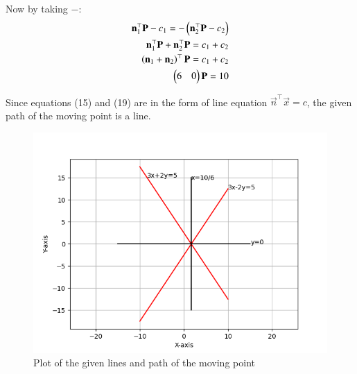 \documentclass[journal]{IEEEtran}
\begin{document}
Now by taking $-$:
\begin{align}
    \mathbf{n}_1^\top\mathbf{P}-c_1=-\left(\mathbf{n}_2^\top\mathbf{P}-c_2\right)\\
    \mathbf{n}_1^\top\mathbf{P}+\mathbf{n}_2^\top\mathbf{P}=c_1+c_2\\
    \left(\mathbf{n}_1+\mathbf{n}_2\right)^\top\mathbf{P}=c_1+c_2\\
    \begin{pmatrix}6&0\end{pmatrix}\mathbf{P}=10
\end{align}

Since equations (15) and (19) are in the form of line equation $\vec{n}^\top\vec{x}=c$, the given path of the moving point is a line.


\begin{figure}[h!]
   \centering
   \includegraphics[width=0.7\linewidth]{figs/plot.png}
   \caption{Plot of the given lines and path of the moving point}
   \label{}
\end{figure}
\end{document}
